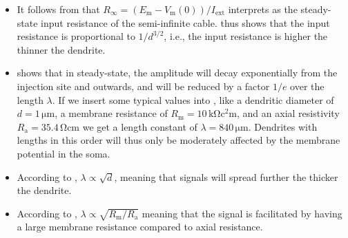\begin{itemize}
\item It follows from  that $R_{\infty} = (E_\mathrm{m}-V_\mathrm{m}(0))/I_\text{ext}$ interprets as the steady-state input resistance of the semi-infinite cable.  thus shows that the input resistance is proportional to $1/d^{3/2}$, i.e., the input resistance is higher the thinner the dendrite. 

\item {} shows that in steady-state, the amplitude will decay exponentially from the injection site and outwards, and will be reduced by a factor $1/e$ over the length $\lambda$. If we insert some typical values into , like a dendritic diameter of $d=1 \, \si{\micro\metre}$, a membrane resistance of $R_\mathrm{m}=10 \,\si{\kilo\ohm\square\centi\metre}$, and an axial resistivity $R_\text{a}=35.4\, \si{\ohm\centi\metre}$ we get a length constant of $\lambda = 840\, \si{\micro\metre}$. Dendrites with lengths in this order will thus only be moderately affected by the membrane potential in the soma. 

\item According to , $\lambda \propto \sqrt{d}$, meaning that signals will spread further the thicker the dendrite.

\item According to , $\lambda \propto \sqrt{R_\mathrm{m}/R_\text{a}}$ meaning that the signal is facilitated by having a large membrane resistance compared to axial resistance. 
\end{itemize}


